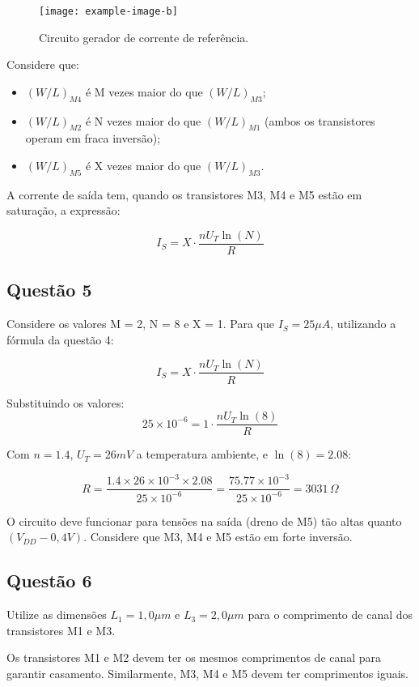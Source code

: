 \documentclass[12pt,a4paper]{article}
\begin{document}
\begin{figure}[H]
    \centering
    \texttt{[image: example-image-b]}
    \caption{Circuito gerador de corrente de referência.}
    \label{fig:gerador_corrente}
\end{figure}

Considere que:
\begin{itemize}
    \item $(W/L)_{M4}$ é M vezes maior do que $(W/L)_{M3}$;
    \item $(W/L)_{M2}$ é N vezes maior do que $(W/L)_{M1}$ (ambos os transistores operam em fraca inversão);
    \item $(W/L)_{M5}$ é X vezes maior do que $(W/L)_{M3}$.
\end{itemize}

A corrente de saída tem, quando os transistores M3, M4 e M5 estão em saturação, a expressão:

$$I_S = X \cdot \frac{nU_T \ln(N)}{R}$$

\subsection*{Questão 5}

Considere os valores M = 2, N = 8 e X = 1. Para que $I_S = 25 \mu A$, utilizando a fórmula da questão 4:

$$I_S = X \cdot \frac{nU_T \ln(N)}{R}$$

Substituindo os valores:
$$25 \times 10^{-6} = 1 \cdot \frac{nU_T \ln(8)}{R}$$

Com $n = 1.4$, $U_T = 26mV$ a temperatura ambiente, e $\ln(8) = 2.08$:

$$R = \frac{1.4 \times 26 \times 10^{-3} \times 2.08}{25 \times 10^{-6}} = \frac{75.77 \times 10^{-3}}{25 \times 10^{-6}} = 3031 \, \Omega$$

O circuito deve funcionar para tensões na saída (dreno de M5) tão altas quanto $(V_{DD} - 0,4V)$. Considere que M3, M4 e M5 estão em forte inversão.

\subsection*{Questão 6}

Utilize as dimensões $L_1 = 1,0 \mu m$ e $L_3 = 2,0 \mu m$ para o comprimento de canal dos transistores M1 e M3. 

Os transistores M1 e M2 devem ter os mesmos comprimentos de canal para garantir casamento. Similarmente, M3, M4 e M5 devem ter comprimentos iguais.
\end{document}
